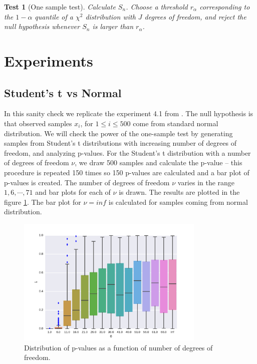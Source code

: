 \documentclass{article}
\newtheorem{test}{Test}
\begin{document}
\begin{test}[One sample test]
\label{test}
Calculate $S_n$. Choose a threshold $r_\alpha$ corresponding to the $1-\alpha$ quantile of a  $\chi^2$ distribution with $J$ degrees of freedom, and reject the null hypothesis whenever $S_n$ is larger than $r_\alpha$. 
\end{test}

\section{Experiments}

\subsection{Student's t vs Normal}
In this  sanity check we replicate the experiment 4.1 from \cite{gorham2015measuring}. The null hypothesis is that observed samples $x_i$, for $1 \leq i \leq 500$ come from standard normal distribution. We will check the power of the one-sample test by generating samples from Student's t distributions with increasing number of degrees of freedom, and analyzing p-values. For the Student's t distribution with a number of degrees of freedom $\nu$, we draw 500 samples and calculate the p-value -- this procedure is repeated 150 times so 150 p-values are calculated and a bar plot of p-values is created. The number of degrees of freedom $\nu$ varies in the range $1,6,\cdots,71$ and bar plots for each of $\nu$ is drawn.  The results are plotted in the figure \ref{fig:studentst}. The bar plot for $\nu = inf$ is calculated for samples coming from normal distribution.

\begin{figure}
\label{fig:studentst}
\includegraphics[width=0.8\textwidth]{./img/student.pdf}
\caption{Distribution of p-values as a function of number of degrees of freedom.}
\end{figure}
\end{document}
